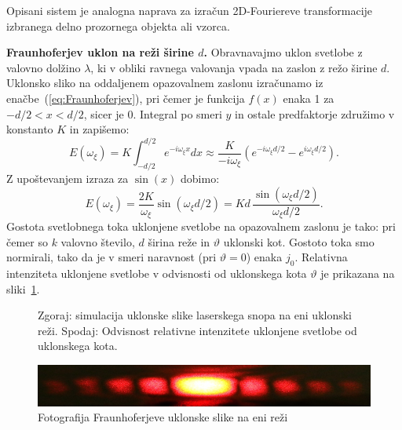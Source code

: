 \begin{remark}
Opisani sistem je analogna naprava za izračun 2D-Fouriereve transformacije izbranega 
delno prozornega objekta ali vzorca.
\end{remark}

\begin{example}{\bf Fraunhoferjev uklon na reži širine $d$.}
Obravnavajmo uklon svetlobe z valovno dolžino $\lambda$, ki v obliki ravnega valovanja 
vpada na zaslon z režo širine $d$. Uklonsko sliko na oddaljenem opazovalnem zaslonu
izračunamo iz enačbe~(\ref{eq:Fraunhoferjev}), pri čemer je funkcija $f(x)$ enaka 1 za
$-d/2<x<d/2$, sicer je 0. Integral po smeri $y$ in ostale predfaktorje združimo
v konstanto $K$ in zapišemo:
\begin{equation}
E(\omega_\xi) = K \int_{-d/2}^{d/2} e^{-i\omega_\xi x} dx \approx
\frac{K}{-i\omega_\xi}\left(e^{-i\omega_\xi d/2}- e^{i\omega_\xi d/2}\right)\!\!.
\label{eq:05_22}
\end{equation}
Z upoštevanjem izraza za $\sin(x)$ dobimo:
\begin{equation}
E(\omega_\xi) = \frac{2K}{\omega_\xi} \sin\left(\omega_\xi d/2\right) = 
Kd\,
\frac{\sin\left(\omega_\xi d/2\right)}{\omega_\xi d/2}.
\label{eq:05_23}
\end{equation}
Gostota svetlobnega toka uklonjene svetlobe na opazovalnem zaslonu je tako:
pri čemer so $k$ valovno število, $d$ širina reže in $\vartheta$ uklonski kot. Gostoto
toka smo normirali, tako da je v smeri naravnost (pri $\vartheta = 0$) enaka $j_0$.
Relativna intenziteta uklonjene svetlobe v odvisnosti od uklonskega kota $\vartheta$ 
je prikazana na sliki~\ref{fig:05_1Reza}.
\begin{figure}[ht]
\centering
\def\svgwidth{90truemm} 

\caption{Zgoraj: simulacija uklonske slike laserskega snopa na eni uklonski reži. Spodaj:
Odvisnost relativne intenzitete uklonjene svetlobe od uklonskega kota.}
\label{fig:05_1Reza}
\end{figure}
\begin{figure}[ht]
\centering
\includegraphics[width=90truemm]{slike/05_photos_Fraunhofer.jpg}
\caption{Fotografija Fraunhoferjeve uklonske slike na eni reži}
\label{fig:05_FranuhoferFoto}
\end{figure}


\end{example}

